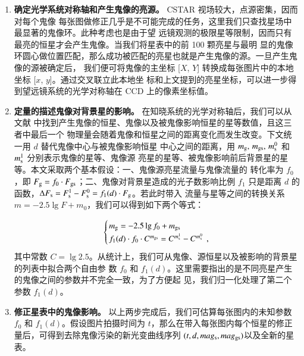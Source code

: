 \begin{enumerate}[leftmargin=1\parindent]

\item \textbf{确定光学系统对称轴和产生鬼像的亮源。} CSTAR 视场较大，点源密集，因而对每个鬼像
每张图做修正几乎是不可能完成的任务，这里我们只查找星场中最显著的鬼像环。此种考虑也是由于望
远镜观测的极限星等限制，因而只有最亮的恒星才会产生鬼像。当我们将星表中的前 100 颗亮星与最明
显的鬼像环圆心做位置匹配，那么成功被匹配的亮星也就是产生鬼像的源。一旦产生鬼像的源被确定后，
我们便可将鬼像的主坐标 [$X$, $Y$] 转换成每张图片中的本地坐标 [$x$, $y$]。通过交叉联立此本地坐
标和上文提到的亮星坐标，可以进一步得到望远镜系统的光学对称轴在 CCD 上的像素坐标值。

\item \textbf{定量的描述鬼像对背景星的影响。} 在知晓系统的光学对称轴后，我们可以从文献 
 中找到产生鬼像的恒星、鬼像以及被鬼像影响恒星的星等数值，且这三者中最后一个
物理量会随着鬼像和恒星之间的距离变化而发生改变。下文统一用 $d$ 替代鬼像中心与被鬼像影响恒星
中心之间的距离，用 $m_\mathrm{g},\,m_\mathrm{gs},\,m_\mathrm{s}^0$ 和 $m_\mathrm{s}^1$ 分别表示鬼像的星等、鬼像源
亮星的星等、被鬼像影响前后背景星的星等。本文采取两个基本假设：一、鬼像源亮星流量与鬼像流量的
转化率为 $f_0$，即 $F_{\rm{g}}=f_0\cdot F_{\rm{gs}}$；二、鬼像对背景星造成的光子数影响比例 $f_1 $ 
只是距离 $d$ 的函数，$\Delta F_{\mathrm{s}}=F_{\mathrm{s}}^1-F_{\mathrm{s}}^0=f_1(d)\cdot F_{\mathrm{g}}$。若此时带入
流量与星等之间的转换关系 $m=-2.5\lg F+m_0$，我们可以得到如下两个等式：


\begin{equation} \label{eq:ghostformular}
\arraycolsep=1.2pt\def\arraystretch{1.3}
\left\{
\begin{array}{l}
m_{\tif{g}} = -2.5 \lg f_0 + m_{\tif{gs}} \\
f_1(d) \cdot f_0 \cdot C^{m_{\tif{gs}}} = C^{m^1_{\tif{s}}}-C^{m^0_{\tif{s}}}  \, \ ,
\end{array} 
\right. 
\end{equation} 
其中常数 $C=\lg 2.5$。从统计上，我们可从鬼像、源恒星以及被影响的背景星的列表中拟合两个自由参
数 $f_0$ 和 $f_1(d)$。这里需要指出的是不同亮星产生的鬼像之间的参数并不完全一致，为了方便起
见，我们归一化处理了第二个参数 $f_1(d)$。

\item \textbf{修正星表中的鬼像影响。} 以上两步完成后，我们可估算每张图内的未知参数 $f_0$ 和 $f_1(d)$。假设图片拍摄时间为 $t$，那么在带入每张图内每个恒星的修正量后，可得到去除鬼像污染的新光变曲线序列 $(t, d, mag_{\mathrm{s}}, mag_{\mathrm{gs}})$以及全新的星表。

\end{enumerate}

